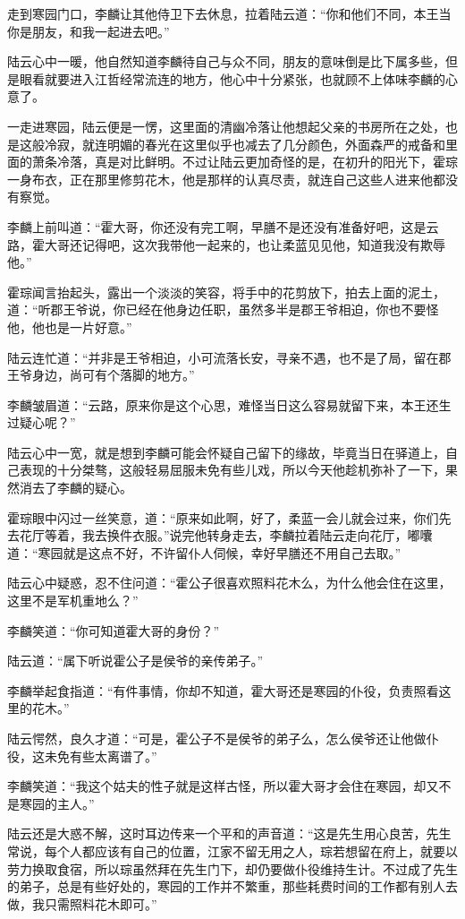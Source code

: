 走到寒园门口，李麟让其他侍卫下去休息，拉着陆云道：“你和他们不同，本王当你是朋友，和我一起进去吧。”

陆云心中一暖，他自然知道李麟待自己与众不同，朋友的意味倒是比下属多些，但是眼看就要进入江哲经常流连的地方，他心中十分紧张，也就顾不上体味李麟的心意了。

一走进寒园，陆云便是一愣，这里面的清幽冷落让他想起父亲的书房所在之处，也是这般冷寂，就连明媚的春光在这里似乎也减去了几分颜色，外面森严的戒备和里面的萧条冷落，真是对比鲜明。不过让陆云更加奇怪的是，在初升的阳光下，霍琮一身布衣，正在那里修剪花木，他是那样的认真尽责，就连自己这些人进来他都没有察觉。

李麟上前叫道：“霍大哥，你还没有完工啊，早膳不是还没有准备好吧，这是云路，霍大哥还记得吧，这次我带他一起来的，也让柔蓝见见他，知道我没有欺辱他。”

霍琮闻言抬起头，露出一个淡淡的笑容，将手中的花剪放下，拍去上面的泥土，道：“听郡王爷说，你已经在他身边任职，虽然多半是郡王爷相迫，你也不要怪他，他也是一片好意。”

陆云连忙道：“并非是王爷相迫，小可流落长安，寻亲不遇，也不是了局，留在郡王爷身边，尚可有个落脚的地方。”

李麟皱眉道：“云路，原来你是这个心思，难怪当日这么容易就留下来，本王还生过疑心呢？”

陆云心中一宽，就是想到李麟可能会怀疑自己留下的缘故，毕竟当日在驿道上，自己表现的十分桀骜，这般轻易屈服未免有些儿戏，所以今天他趁机弥补了一下，果然消去了李麟的疑心。

霍琮眼中闪过一丝笑意，道：“原来如此啊，好了，柔蓝一会儿就会过来，你们先去花厅等着，我去换件衣服。”说完他转身走去，李麟拉着陆云走向花厅，嘟囔道：“寒园就是这点不好，不许留仆人伺候，幸好早膳还不用自己去取。”

陆云心中疑惑，忍不住问道：“霍公子很喜欢照料花木么，为什么他会住在这里，这里不是军机重地么？”

李麟笑道：“你可知道霍大哥的身份？”

陆云道：“属下听说霍公子是侯爷的亲传弟子。”

李麟举起食指道：“有件事情，你却不知道，霍大哥还是寒园的仆役，负责照看这里的花木。”

陆云愕然，良久才道：“可是，霍公子不是侯爷的弟子么，怎么侯爷还让他做仆役，这未免有些太离谱了。”

李麟笑道：“我这个姑夫的性子就是这样古怪，所以霍大哥才会住在寒园，却又不是寒园的主人。”

陆云还是大惑不解，这时耳边传来一个平和的声音道：“这是先生用心良苦，先生常说，每个人都应该有自己的位置，江家不留无用之人，琮若想留在府上，就要以劳力换取食宿，所以琮虽然拜在先生门下，却仍要做仆役维持生计。不过成了先生的弟子，总是有些好处的，寒园的工作并不繁重，那些耗费时间的工作都有别人去做，我只需照料花木即可。”

